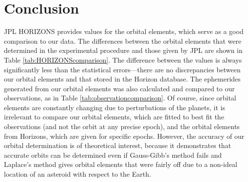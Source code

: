\documentclass[12pt,journal,compsoc]{IEEEtran}
\begin{document}
\begin{table}[!t]
\centering
{}
\caption{Comparison of JPL HORIZONS ephemerides and ephemerides from determined orbital elements with observation data\label{tab:observationcomparison}}
\end{table}

\section{Conclusion}
JPL HORIZONS provides values for the orbital elements, which serve as a good comparison to our data.
The differences between the orbital elements that were determined in the experimental procedure and those given by JPL are shown in Table \ref{tab:HORIZONScomparison}.
The difference between the values is always significantly less than the statistical errors---there are no discrepancies between
our orbital elements and that stored in the Horizon database.
The ephemerides generated from our orbital elements was also calculated and compared to our observations, as in Table \ref{tab:observationcomparison}.
Of course, since orbital elements are constantly changing due to perturbations of the planets,
it is irrelevant to compare our orbital elements, which are fitted to best fit the observations (and not the orbit at any
precise epoch), and the 
orbital elements from Horizons, which are given for specific epochs.
However, the accuracy of our orbital determination is of theoretical interest, because 
it demonstrates that accurate orbits can be determined even if Gauss-Gibb's method fails and Laplace's method
gives orbital elements that were fairly off due to a non-ideal location of an asteroid with respect to the Earth.

\end{document}
